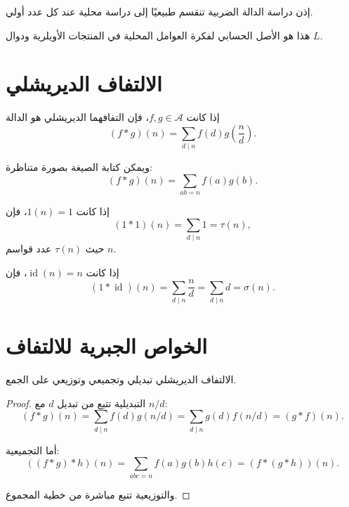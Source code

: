 إذن دراسة الدالة الضربية تنقسم طبيعيًا إلى دراسة محلية عند كل عدد أولي.

\begin{remark}
هذا هو الأصل الحسابي لفكرة العوامل المحلية في المنتجات الأويلرية ودوال \(L\).
\end{remark}

\section{الالتفاف الديريشلي}

\begin{definition}
إذا كانت \(f,g\in\mathcal{A}\)، فإن التفافهما الديريشلي هو الدالة
\[
(f*g)(n)
=
\sum_{d\mid n}f(d)g\left(\frac{n}{d}\right).
\]
\end{definition}

ويمكن كتابة الصيغة بصورة متناظرة:
\[
(f*g)(n)
=
\sum_{ab=n}f(a)g(b).
\]

\begin{example}
إذا كانت \(1(n)=1\)، فإن
\[
(1*1)(n)
=
\sum_{d\mid n}1
=
\tau(n),
\]
حيث \(\tau(n)\) عدد قواسم \(n\).
\end{example}

\begin{example}
إذا كانت \(\operatorname{id}(n)=n\)، فإن
\[
(1*\operatorname{id})(n)
=
\sum_{d\mid n}\frac{n}{d}
=
\sum_{d\mid n}d
=
\sigma(n).
\]
\end{example}

\section{الخواص الجبرية للالتفاف}

\begin{theorem}
\label{thm:dirichlet-convolution-algebra}
\provedhere
الالتفاف الديريشلي تبديلي وتجميعي وتوزيعي على الجمع.
\end{theorem}

\begin{proof}
التبديلية تتبع من تبديل \(d\) مع \(n/d\):
\[
(f*g)(n)
=
\sum_{d\mid n}f(d)g(n/d)
=
\sum_{d\mid n}g(d)f(n/d)
=
(g*f)(n).
\]

أما التجميعية:
\[
((f*g)*h)(n)
=
\sum_{abc=n}f(a)g(b)h(c)
=
(f*(g*h))(n).
\]

والتوزيعية تتبع مباشرة من خطية المجموع.
\end{proof}

